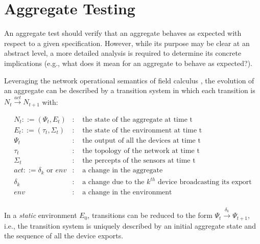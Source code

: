 \section{Aggregate Testing}
\label{section:analysis:aggregate-testing}

An aggregate test should verify that an aggregate behaves as expected with
respect to a given specification. However, while its purpose may be clear at an
abstract level, a more detailed analysis is required to determine its concrete
implications (e.g., what does it mean for an aggregate to behave as expected?).

Leveraging the network operational semantics of field calculus
\cite{CAS-AggregateComputingBlocks}, the evolution of an aggregate can be
described by a transition system in which each transition is $N_{t}
\xrightarrow{act} N_{t+1}$ with:

\begin{align*}
   & N_t::=(\Psi_t, E_t)                & : & \textrm{ the state of the aggregate at time t}                                 & \\
   & E_t::=(\tau_t, \Sigma_t)           & : & \textrm{ the state of the environment at time t}                               & \\
   & \Psi_t                             & : & \textrm{ the output of all the devices at time t}                              & \\
   & \tau_t                             & : & \textrm{ the topology of the network at time t}                                & \\
   & \Sigma_t                           & : & \textrm{ the percepts of the sensors at time t}                                & \\
   & act::=\delta_{k} \textrm{ or } env & : & \textrm{ a change in the aggregate}                                            & \\
   & \delta_{k}                         & : & \textrm{ a change due to the } k^{th} \textrm{ device broadcasting its export} & \\
   & env                                & : & \textrm{ a change in the environment}                                          & \\
\end{align*}

In a \textit{static} environment $E_0$, transitions can be reduced to the form
$\Psi_{t} \xrightarrow{\delta_{k}} \Psi_{t+1}$, i.e., the transition system is
uniquely described by an initial aggregate state and the sequence of all the
device exports.

